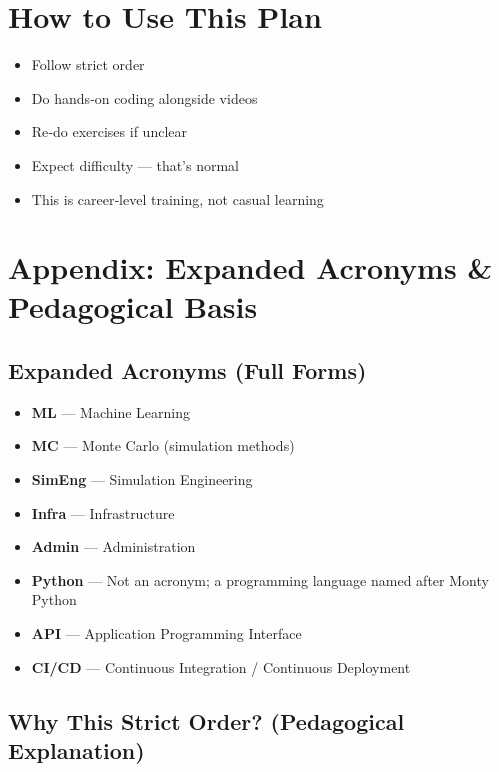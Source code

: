 \documentclass[12pt]{article}
\begin{document}
	\vspace{0.5cm}
	
	\section*{How to Use This Plan}
	\begin{itemize}
		\item Follow strict order
		\item Do hands‑on coding alongside videos
		\item Re‑do exercises if unclear
		\item Expect difficulty — that’s normal
		\item This is career‑level training, not casual learning
	\end{itemize}
	
	\newpage
	
	\section*{Appendix: Expanded Acronyms \& Pedagogical Basis}
	
	\subsection*{Expanded Acronyms (Full Forms)}
	\begin{itemize}
		\item \textbf{ML} — Machine Learning
		\item \textbf{MC} — Monte Carlo (simulation methods)
		\item \textbf{SimEng} — Simulation Engineering
		\item \textbf{Infra} — Infrastructure
		\item \textbf{Admin} — Administration
		\item \textbf{Python} — Not an acronym; a programming language named after Monty Python
		\item \textbf{API} — Application Programming Interface
		\item \textbf{CI/CD} — Continuous Integration / Continuous Deployment
	\end{itemize}
	
	\subsection*{Why This Strict Order? (Pedagogical Explanation)}
	
\end{document}
